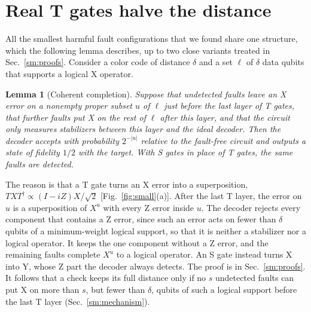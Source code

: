 \documentclass[aps,prl,reprint,twocolumn,amsmath,amssymb,floatfix,nofootinbib,superscriptaddress]{revtex4-2}
\newtheorem{lemma}[theorem]{Lemma}
\theoremstyle{definition}
\theoremstyle{remark}
\begin{document}
\section{Real T gates halve the distance}
All the smallest harmful fault configurations that we found share one structure, which the following lemma describes, up to two close variants treated in Sec.~\ref{sm:proofs}. Consider a color code of distance $\delta$ and a set $\ell$ of $\delta$ data qubits that supports a logical X operator.
\begin{lemma}[Coherent completion]\label{lem:completion}
Suppose that undetected faults leave an X error on a nonempty proper subset $u$ of $\ell$ just before the last layer of T gates, that further faults put X on the rest of $\ell$ after this layer, and that the circuit only measures stabilizers between this layer and the ideal decoder. Then the decoder accepts with probability $2^{-|u|}$ relative to the fault-free circuit and outputs a state of fidelity $1/2$ with the target. With S gates in place of T gates, the same faults are detected.
\end{lemma}
The reason is that a T gate turns an X error into a superposition, $TXT^\dagger\propto(I-iZ)X/\sqrt2$ [Fig.~\ref{fig:small}(a)]. After the last T layer, the error on $u$ is a superposition of $X^u$ with every Z error inside $u$. The decoder rejects every component that contains a Z error, since such an error acts on fewer than $\delta$ qubits of a minimum-weight logical support, so that it is neither a stabilizer nor a logical operator. It keeps the one component without a Z error, and the remaining faults complete $X^u$ to a logical operator. An S gate instead turns X into Y, whose Z part the decoder always detects. The proof is in Sec.~\ref{sm:proofs}. It follows that a check keeps its full distance only if no $s$ undetected faults can put X on more than $s$, but fewer than $\delta$, qubits of such a logical support before the last T layer (Sec.~\ref{sm:mechanism}).
\end{document}
